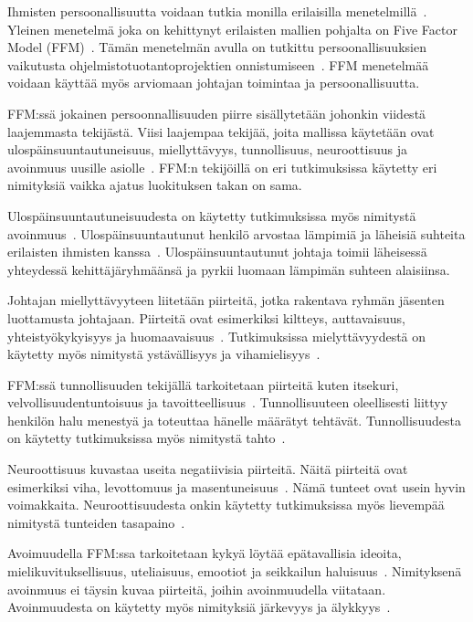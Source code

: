 \documentclass[finnish]{tktltiki2}
\theoremstyle{definition}
\theoremstyle{remark}
\begin{document}
Ihmisten persoonallisuutta voidaan tutkia monilla erilaisilla menetelmillä~\cite{digman1990personality}. Yleinen menetelmä joka on kehittynyt erilaisten mallien pohjalta on Five Factor Model (FFM)~\cite{digman1990personality, barrick2006big}. Tämän menetelmän avulla on tutkittu persoonallisuuksien vaikutusta ohjelmistotuotantoprojektien onnistumiseen~\cite{Wang:2009:PMP:1639950.1640049}. FFM menetelmää voidaan käyttää myös arviomaan johtajan toimintaa ja persoonallisuutta.

FFM:ssä jokainen persoonnallisuuden piirre sisällytetään johonkin viidestä laajemmasta tekijästä. Viisi laajempaa tekijää, joita mallissa käytetään ovat  ulospäinsuuntautuneisuus, miellyttävyys, tunnollisuus, neuroottisuus ja avoinmuus uusille asiolle~\cite{barrick2006big, digman1990personality}. FFM:n tekijöillä on eri tutkimuksissa käytetty eri nimityksiä vaikka ajatus luokituksen takan on sama.  

Ulospäinsuuntautuneisuudesta  on käytetty tutkimuksissa myös nimitystä avoinmuus~\cite{digman1990personality}. Ulospäinsuuntautunut henkilö arvostaa lämpimiä ja läheisiä suhteita erilaisten ihmisten kanssa~\cite{Wang:2009:PMP:1639950.1640049}.  Ulospäinsuuntautunut johtaja toimii läheisessä yhteydessä kehittäjäryhmäänsä ja pyrkii luomaan lämpimän suhteen alaisiinsa. 

Johtajan miellyttävyyteen liitetään piirteitä, jotka rakentava  ryhmän jäsenten luottamusta johtajaan. Piirteitä ovat esimerkiksi kiltteys, auttavaisuus, yhteistyökykyisyys ja huomaavaisuus~\cite{Wang:2009:PMP:1639950.1640049}. Tutkimuksissa mielyttävyydestä on käytetty myös nimitystä ystävällisyys ja vihamielisyys~\cite{digman1990personality}. 

FFM:ssä tunnollisuuden tekijällä tarkoitetaan piirteitä kuten itsekuri, velvollisuudentuntoisuus ja tavoitteellisuus~\cite{Wang:2009:PMP:1639950.1640049}. Tunnollisuuteen oleellisesti liittyy henkilön halu menestyä ja toteuttaa hänelle määrätyt tehtävät. Tunnollisuudesta on käytetty tutkimuksissa myös nimitystä tahto~\cite{digman1990personality}. 

Neuroottisuus kuvastaa useita negatiivisia piirteitä. Näitä piirteitä ovat esimerkiksi viha, levottomuus ja masentuneisuus~\cite{Wang:2009:PMP:1639950.1640049}. Nämä tunteet ovat usein hyvin voimakkaita. Neuroottisuudesta onkin käytetty tutkimuksissa myös lievempää nimitystä tunteiden tasapaino~\cite{digman1990personality}. 

Avoimuudella FFM:ssa tarkoitetaan kykyä löytää epätavallisia ideoita, mielikuvituksellisuus, uteliaisuus, emootiot ja seikkailun haluisuus~\cite{Wang:2009:PMP:1639950.1640049}. Nimityksenä avoinmuus ei täysin kuvaa piirteitä, joihin avoinmuudella viitataan. Avoinmuudesta on käytetty myös nimityksiä järkevyys ja älykkyys~\cite{digman1990personality}. 
\end{document}
